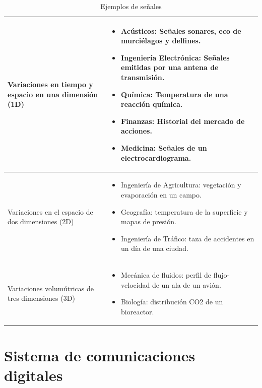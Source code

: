 \begin{table}[ht]
\begin{center}
	\begin{tabular}{|p{6cm}|p{7.3cm}|}
		\hline
		Variaciones en tiempo y espacio en una dimensi\'on (1D) &
		\begin{itemize}
		  \item Ac\'usticos: Se\~nales sonares, eco de murci\'elagos y delfines.
		  \item Ingenier\'ia Electr\'onica: Se\~nales emitidas por una antena de
		  transmisi\'on.
		  \item Qu\'imica: Temperatura de una reacci\'on qu\'imica.
		  \item Finanzas: Historial del mercado de acciones.
		  \item Medicina: Se\~nales de un electrocardiograma.
		\end{itemize} \\
		\hline
		Variaciones en el espacio de dos dimensiones (2D) &
		\begin{itemize}
		  \item Ingenier\'ia de Agricultura: vegetaci\'on y evaporaci\'on en un campo.
		  \item Geograf\'ia: temperatura de la superficie y mapas de presi\'on.
		  \item Ingenier\'ia de Tr\'afico: taza de accidentes en un d\'ia de una
		  ciudad.
		\end{itemize} \\
		\hline
		Variaciones volum\'utricas de tres dimensiones (3D) &
		\begin{itemize}
		  \item Mec\'anica de fluidos: perfil de flujo-velocidad de un ala de un
		  avi\'on.
		  \item Biolog\'ia: distribuci\'on CO2 de un bioreactor.
		\end{itemize} \\
		\hline
	\end{tabular}\label{tbl:signals}
	\vspace{0.5in}
	\caption{Ejemplos de se\~nales}
\end{center}
\end{table}

\newpage
\section{Sistema de comunicaciones digitales}

